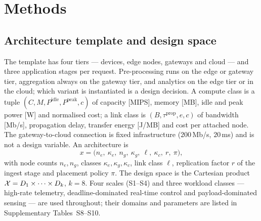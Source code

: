 \section*{Methods}
\label{sec:ce:methods}

\subsection*{Architecture template and design space}
The template has four tiers --- devices, edge nodes, gateways and cloud --- and three
application stages per request. Pre-processing runs on the edge or gateway tier,
aggregation always on the gateway tier, and analytics on the edge tier or in the cloud;
which variant is instantiated is a design decision. A compute class is a tuple
$(C,M,P^{\mathrm{idle}},P^{\mathrm{peak}},c)$ of capacity [MIPS], memory [MB], idle and
peak power [W] and normalised cost; a link class is $(B,\tau^{\mathrm{prop}},e,c)$ of
bandwidth [Mb/s], propagation delay, transfer energy [J/MB] and cost per attached node.
The gateway-to-cloud connection is fixed infrastructure ($200$\,Mb/s, $20$\,ms) and is
not a design variable. An architecture is
\begin{equation}
x=\big(n_e,\ \kappa_e,\ n_g,\ \kappa_g,\ \ell,\ \kappa_c,\ r,\ \pi\big),
\label{eq:ce:decision}
\end{equation}
with node counts $n_e,n_g$, classes $\kappa_e,\kappa_g,\kappa_c$, link class $\ell$,
replication factor $r$ of the ingest stage and placement policy $\pi$. The design space is
the Cartesian product $\mathcal{X}=D_1\times\dots\times D_k$, $k=8$. Four scales
(S1--S4) and three workload classes --- high-rate telemetry, deadline-dominated real-time
control and payload-dominated sensing --- are used throughout; their domains and
parameters are listed in Supplementary Tables~S8--S10.

